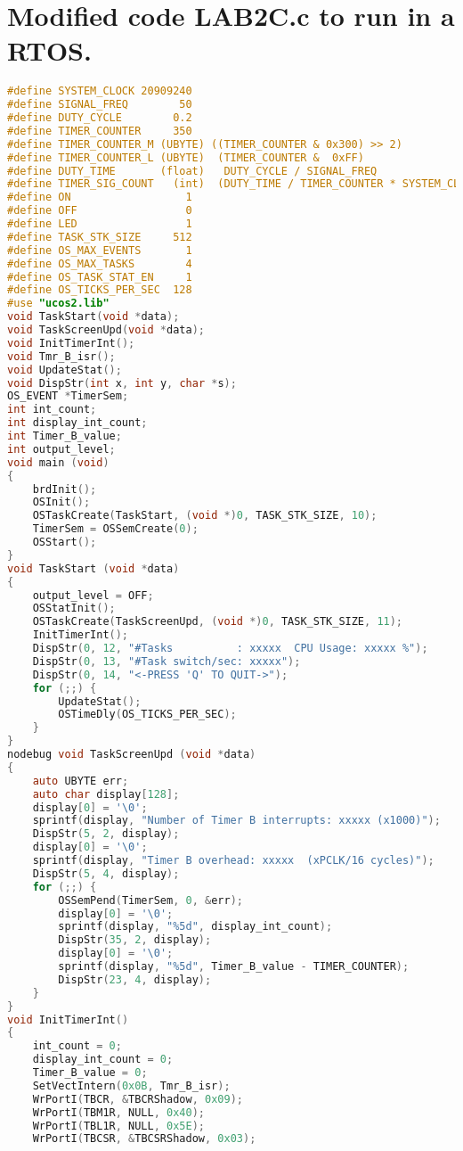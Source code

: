 \vfill \columnbreak
\section{Modified code LAB2C.c to run in a RTOS.}
\begin{lstlisting}[language=C]
#define SYSTEM_CLOCK 20909240
#define SIGNAL_FREQ        50
#define DUTY_CYCLE        0.2
#define TIMER_COUNTER     350
#define TIMER_COUNTER_M (UBYTE) ((TIMER_COUNTER & 0x300) >> 2)
#define TIMER_COUNTER_L (UBYTE)  (TIMER_COUNTER &  0xFF)
#define DUTY_TIME       (float)   DUTY_CYCLE / SIGNAL_FREQ
#define TIMER_SIG_COUNT   (int)  (DUTY_TIME / TIMER_COUNTER * SYSTEM_CLOCK)
#define ON                  1
#define OFF                 0
#define LED                 1
#define TASK_STK_SIZE     512
#define OS_MAX_EVENTS       1
#define OS_MAX_TASKS        4
#define OS_TASK_STAT_EN     1
#define OS_TICKS_PER_SEC  128
#use "ucos2.lib"
void TaskStart(void *data);
void TaskScreenUpd(void *data);
void InitTimerInt();
void Tmr_B_isr();
void UpdateStat();
void DispStr(int x, int y, char *s);
OS_EVENT *TimerSem;
int int_count;
int display_int_count;
int Timer_B_value;
int output_level;
void main (void)
{
    brdInit();
    OSInit();
    OSTaskCreate(TaskStart, (void *)0, TASK_STK_SIZE, 10);
    TimerSem = OSSemCreate(0);
    OSStart();
}
void TaskStart (void *data)
{
    output_level = OFF;
    OSStatInit();
    OSTaskCreate(TaskScreenUpd, (void *)0, TASK_STK_SIZE, 11);
    InitTimerInt();
    DispStr(0, 12, "#Tasks          : xxxxx  CPU Usage: xxxxx %");
    DispStr(0, 13, "#Task switch/sec: xxxxx");
    DispStr(0, 14, "<-PRESS 'Q' TO QUIT->");
    for (;;) {
        UpdateStat();
        OSTimeDly(OS_TICKS_PER_SEC);
    }
}
nodebug void TaskScreenUpd (void *data)
{
    auto UBYTE err;
    auto char display[128];
    display[0] = '\0';
    sprintf(display, "Number of Timer B interrupts: xxxxx (x1000)");
    DispStr(5, 2, display);
    display[0] = '\0';
    sprintf(display, "Timer B overhead: xxxxx  (xPCLK/16 cycles)");
    DispStr(5, 4, display);
    for (;;) {
        OSSemPend(TimerSem, 0, &err);
        display[0] = '\0';
        sprintf(display, "%5d", display_int_count);
        DispStr(35, 2, display);
        display[0] = '\0';
        sprintf(display, "%5d", Timer_B_value - TIMER_COUNTER);
        DispStr(23, 4, display);
    }
}
void InitTimerInt()
{
    int_count = 0;
    display_int_count = 0;
    Timer_B_value = 0;
    SetVectIntern(0x0B, Tmr_B_isr);
    WrPortI(TBCR, &TBCRShadow, 0x09);
    WrPortI(TBM1R, NULL, 0x40);
    WrPortI(TBL1R, NULL, 0x5E);
    WrPortI(TBCSR, &TBCSRShadow, 0x03);

\end{lstlisting}
